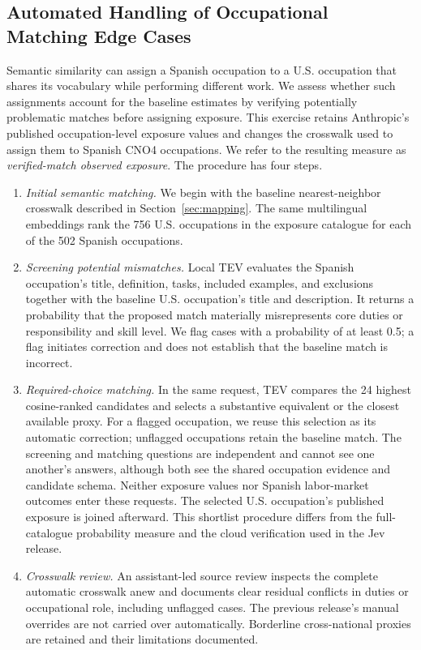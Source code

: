\clearpage
\subsection*{Automated Handling of Occupational Matching Edge Cases}
\label{sec:v1_edgecase_matching}

Semantic similarity can assign a Spanish occupation to a U.S. occupation that shares its vocabulary while performing different work. We assess whether such assignments account for the baseline estimates by verifying potentially problematic matches before assigning exposure. This exercise retains Anthropic's published occupation-level exposure values and changes the crosswalk used to assign them to Spanish CNO4 occupations. We refer to the resulting measure as \emph{verified-match observed exposure}. The procedure has four steps.

\begin{enumerate}
\item \textit{Initial semantic matching.} We begin with the baseline nearest-neighbor crosswalk described in Section~\ref{sec:mapping}. The same multilingual embeddings rank the 756 U.S. occupations in the exposure catalogue for each of the 502 Spanish occupations.

\item \textit{Screening potential mismatches.} Local TEV evaluates the Spanish occupation's title, definition, tasks, included examples, and exclusions together with the baseline U.S. occupation's title and description. It returns a probability that the proposed match materially misrepresents core duties or responsibility and skill level. We flag cases with a probability of at least 0.5; a flag initiates correction and does not establish that the baseline match is incorrect.

\item \textit{Required-choice matching.} In the same request, TEV compares the 24 highest cosine-ranked candidates and selects a substantive equivalent or the closest available proxy. For a flagged occupation, we reuse this selection as its automatic correction; unflagged occupations retain the baseline match. The screening and matching questions are independent and cannot see one another's answers, although both see the shared occupation evidence and candidate schema. Neither exposure values nor Spanish labor-market outcomes enter these requests. The selected U.S. occupation's published exposure is joined afterward. This shortlist procedure differs from the full-catalogue probability measure and the cloud verification used in the Jev release.

\item \textit{Crosswalk review.} An assistant-led source review inspects the complete automatic crosswalk anew and documents clear residual conflicts in duties or occupational role, including unflagged cases. The previous release's manual overrides are not carried over automatically. Borderline cross-national proxies are retained and their limitations documented. 
\end{enumerate}

